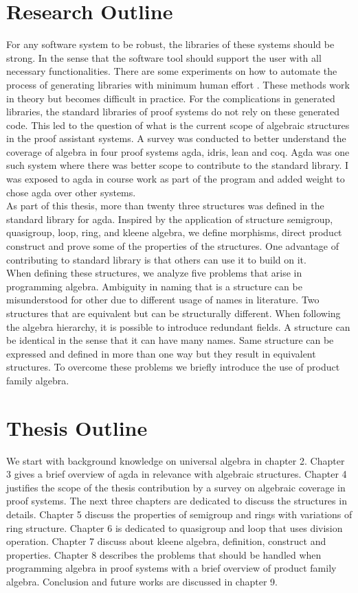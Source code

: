 \section{Research Outline}
For any software system to be robust, the libraries of these systems should be strong. In the sense that the software tool should support the user with all necessary functionalities. There are some experiments on how to automate the process of generating libraries with minimum human effort \cite{BuildingDiamond}. These methods work in theory but becomes difficult in practice. For the complications in generated libraries, the standard libraries of proof systems do not rely on these generated code. This led to the question of what is the current scope of algebraic structures in the proof assistant systems. A survey was conducted to better understand the coverage of algebra in four proof systems agda, idris, lean and coq. Agda was one such system where there was better scope to contribute to the standard library. I was exposed to agda in course work as part of the program and added weight to chose agda over other systems. \\

As part of this thesis, more than twenty three structures was defined in the standard library for agda. Inspired by the application of structure semigroup, quasigroup, loop, ring, and kleene algebra, we define morphisms, direct product construct and prove some of the properties of the structures. One advantage of contributing to standard library is that others can use it to build on it.\\

When defining these structures, we analyze five problems that arise in programming algebra. Ambiguity in naming that is a structure can be misunderstood for other due to different usage of names in literature. Two structures that are equivalent but can be structurally different. When following the algebra hierarchy, it is possible to introduce redundant fields. A structure can be identical in the sense that it can have many names. Same structure can be expressed and defined in more than one way but they result in equivalent structures. To overcome these problems we briefly introduce the use of product family algebra.\\

\section{Thesis Outline}
We start with background knowledge on universal algebra in chapter 2. Chapter 3 gives a brief overview of agda in relevance with algebraic structures. Chapter 4 justifies the scope of the thesis contribution by a survey on algebraic coverage in proof systems. The next three chapters are dedicated to discuss the structures in details. Chapter 5 discuss the properties of semigroup and rings with variations of ring structure. Chapter 6 is dedicated to quasigroup and loop that uses division operation. Chapter 7 discuss about kleene algebra, definition, construct and properties. Chapter 8 describes the problems that should be handled when programming algebra in proof systems with a brief overview of product family algebra. Conclusion and future works are discussed in chapter 9.
